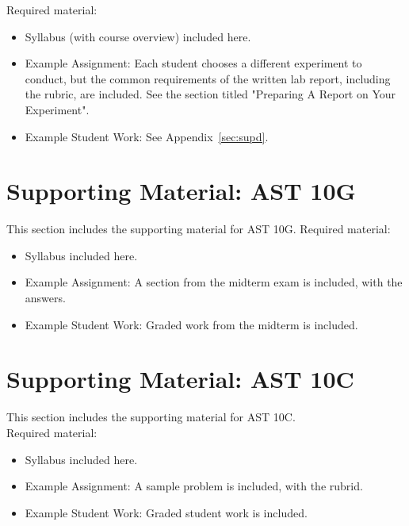 \documentclass[12pt]{article}
\begin{document}
\noindent
Required material:
\begin{itemize}
 \item Syllabus (with course overview) included here.
 \item Example Assignment:  Each student chooses a different experiment to conduct, but the common requirements of the written lab report, including the rubric, are included.  See the section titled "Preparing A Report on Your Experiment".
 \item Example Student Work:  See Appendix~\ref{sec:supd}.
\end{itemize}

\newpage


  


\section{Supporting Material: AST 10G}
\label{sec:supb}

This section includes the supporting material for AST 10G.
\noindent
Required material:
\begin{itemize}
 \item Syllabus included here.
 \item Example Assignment:  A section from the midterm exam is included, with the answers.
 \item Example Student Work:  Graded work from the midterm is included.
\end{itemize}



  
  
  


\newpage
\section{Supporting Material: AST 10C}
\label{sec:supc}

This section includes the supporting material for AST 10C.\\

\noindent
Required material:
\begin{itemize}
 \item Syllabus included here.
 \item Example Assignment:  A sample problem is included, with the rubrid.
 \item Example Student Work:  Graded student work is included.
\end{itemize}
\end{document}
